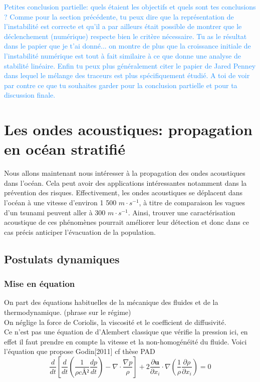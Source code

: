 \documentclass{rapportECC}
\newcommand{\FAadd}[1]{\textcolor{DodgerBlue}{{#1}}}                     %
\begin{document}
\FAadd{Petites conclusion partielle: quels étaient les objectifs et quels sont tes conclusions ? Comme pour la section précédente, tu peux dire que la représentation de l'instabilité est correcte et qu'il a par ailleurs était possible de montrer que le déclenchement (numérique) respecte bien le critère nécessaire. Tu as le résultat dans le papier que je t'ai donné... on montre de plus que la croissance initiale de l'instabilité numérique est tout à fait similaire à ce que donne une analyse de stabilité linéaire. Enfin tu peux plus généralement citer le papier de Jared Penney dans lequel le mélange des traceurs est plus spécifiquement étudié. A toi de voir par contre ce que tu souhaites garder pour la conclusion partielle et pour ta discussion finale.}\\






\section{Les ondes acoustiques: propagation en océan stratifié}

Nous allons maintenant nous intéresser à la propagation des ondes acoustiques dans l'océan. Cela peut avoir des applications intéressantes notamment dans la prévention des risques. Effectivement, les ondes acoustiques se déplacent dans l'océan à une vitesse d'environ 1 500 $m \cdot s^{-1}$, à titre de comparaison les vagues d'un tsunami peuvent aller à 300 $m \cdot s^{-1}$. Ainsi, trouver une caractérisation acoustique de ces phénomènes pourrait améliorer leur détection et donc dans ce cas précis anticiper l'évacuation de la population.

\subsection{Postulats dynamiques}
\subsubsection{Mise en équation}


On part des équations habituelles de la mécanique des fluides et de la thermodynamique. (phrase sur le régime)
\\
On néglige la force de Coriolis, la viscosité et le coefficient de diffusivité.
\\
Ce n'est pas une équation de d'Alembert classique que vérifie la pression ici, en effet il faut prendre en compte la vitesse et la non-homogénéité du fluide. Voici l'équation que propose Godin[2011] cf thèse PAD
\begin{equation}
    \frac{d}{dt}[\frac{d}{dt}(\frac{1}{\rho cÂ²}\frac{dp}{dt}) - \nabla \cdot \frac{\nabla p}{\rho}] + 2\frac{\partial \mathbf{u}}{\partial x_i} \cdot \nabla (\frac{1}{\rho}\frac{\partial \rho}{\partial x_i}) = 0
\end{equation}
\end{document}
